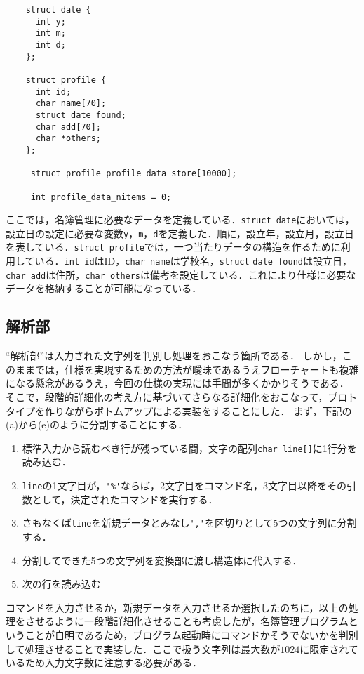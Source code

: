 \documentclass[a4j,11pt]{jarticle}
\begin{document}
{\fontsize{10pt}{11pt} \selectfont
\begin{verbatim}
    struct date {
      int y;
      int m;
      int d;
    };

    struct profile {
      int id;
      char name[70];
      struct date found;
      char add[70];
      char *others;
    };

     struct profile profile_data_store[10000];

     int profile_data_nitems = 0;

\end{verbatim}
}

ここでは，名簿管理に必要なデータを定義している．\verb|struct date|においては，設立日の設定に必要な変数\verb|y|，\verb|m|，\verb|d|を定義した．順に，設立年，設立月，設立日を表している．\verb|struct profile|では，一つ当たりデータの構造を作るために利用している．\verb|int id|はID，\verb|char name|は学校名，\verb|struct| \verb|date found|は設立日，\verb|char add|は住所，\verb|char others|は備考を設定している．これにより仕様に必要なデータを格納することが可能になっている．

\subsection{解析部} \label{sec:parse}

``解析部''は入力された文字列を判別し処理をおこなう箇所である．
しかし，このままでは，仕様を実現するための方法が曖昧であるうえフローチャートも複雑になる懸念があるうえ，今回の仕様の実現には手間が多くかかりそうである．
そこで，段階的詳細化の考え方に基づいてさらなる詳細化をおこなって，プロトタイプを作りながらボトムアップによる実装をすることにした．
まず，下記の(a)から(e)のように分割することにする．

\begin{enumerate}
\setlength{\parskip}{2pt} \setlength{\itemsep}{2pt}
\renewcommand{\labelenumi}{(\alph{enumi})} %
    \item 標準入力から読むべき行が残っている間，文字の配列\verb|char line[]|に1行分を読み込む．
    \item \verb|line|の1文字目が，\verb|'%'|ならば，2文字目をコマンド名，3文字目以降をその引数として，決定されたコマンドを実行する．
    \item さもなくば\verb|line|を新規データとみなし\verb|','|を区切りとして5つの文字列に分割する．
    \item 分割してできた5つの文字列を変換部に渡し構造体に代入する．
    \item 次の行を読み込む
\end{enumerate}
コマンドを入力させるか，新規データを入力させるか選択したのちに，以上の処理をさせるように一段階詳細化させることも考慮したが，名簿管理プログラムということが自明であるため，プログラム起動時にコマンドかそうでないかを判別して処理させることで実装した．ここで扱う文字列は最大数が$1024$に限定されているため入力文字数に注意する必要がある．
\end{document}

